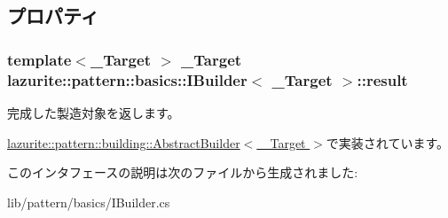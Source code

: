 \subsection{プロパティ}
\hypertarget{interfacelazurite_1_1pattern_1_1basics_1_1_i_builder_3_01___target_01_4_a7955fa44ef66bbe59f764a300001cead}{
\subsubsection[{result}]{\setlength{\rightskip}{0pt plus 5cm}template$<$\_\-Target $>$ \_\-Target lazurite::pattern::basics::IBuilder$<$ \_\-Target $>$::result}}
\label{interfacelazurite_1_1pattern_1_1basics_1_1_i_builder_3_01___target_01_4_a7955fa44ef66bbe59f764a300001cead}


完成した製造対象を返します。 

\hyperlink{classlazurite_1_1pattern_1_1building_1_1_abstract_builder_3_01___target_01_4_a934a7ec1f51a62a61fb73998fbb2108a}{lazurite::pattern::building::AbstractBuilder$<$ \_\-Target $>$}で実装されています。

このインタフェースの説明は次のファイルから生成されました:\begin{DoxyCompactItemize}
\item 
lib/pattern/basics/IBuilder.cs\end{DoxyCompactItemize}
